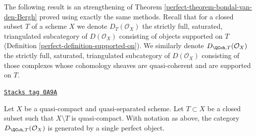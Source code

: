 The following result is an strengthening of
Theorem \ref{perfect-theorem-bondal-van-den-Bergh}
proved using exactly the same methods.
Recall that for a closed subset $T$ of a scheme $X$ we denote
$D_T(\mathcal{O}_X)$ the strictly full, saturated,
triangulated subcategory of $D(\mathcal{O}_X)$ consisting of objects
supported on $T$ (Definition \ref{perfect-definition-supported-on}).
We similarly denote $D_{\QCoh, T}(\mathcal{O}_X)$ the strictly full, saturated,
triangulated subcategory of $D(\mathcal{O}_X)$ consisting of those
complexes whose cohomology sheaves are quasi-coherent and are supported
on $T$.

\begin{lemma}
\label{perfect-lemma-generator-with-support}
\href{https://stacks.math.columbia.edu/tag/0A9A}{\texttt{Stacks tag 0A9A}}

\begin{reference}
\cite[Theorem 6.8]{Rouquier-dimensions}
\end{reference}
Let $X$ be a quasi-compact and quasi-separated scheme. Let $T \subset X$ be a
closed subset such that $X \setminus T$ is quasi-compact. With notation
as above, the category $D_{\QCoh, T}(\mathcal{O}_X)$ is generated by a
single perfect object.
\end{lemma}

